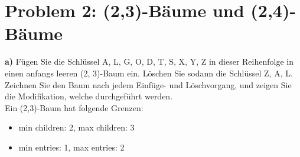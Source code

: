 \section*{Problem 2: (2,3)-Bäume und (2,4)-Bäume} 


\textbf{a)} Fügen Sie die Schlüssel A, L, G, O, D, T, S, X, Y, Z in dieser Reihenfolge in einen anfangs leeren (2, 3)-Baum ein. Löschen Sie sodann die Schlüssel Z, A, L. Zeichnen Sie den Baum nach jedem Einfüge- und Löschvorgang, und zeigen Sie die Modifikation, welche durchgeführt werden. \\


Ein (2,3)-Baum hat folgende Grenzen:
\begin{itemize}
\item min children: 2, max children: 3
\item min entries: 1, max entries: 2
\end{itemize}

